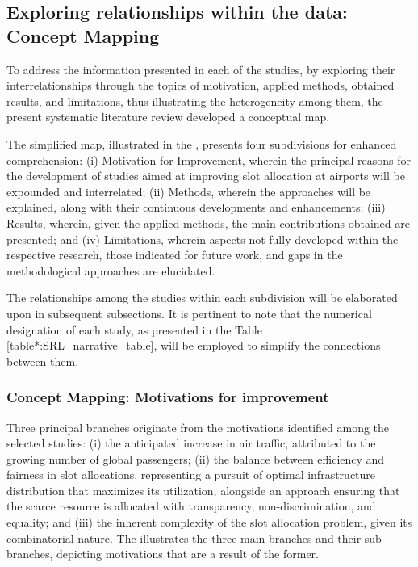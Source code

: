 
\clearpage

\subsection{Exploring relationships within the data: Concept Mapping}

To address the information presented in each of the studies, by exploring their interrelationships through the topics of motivation, applied methods, obtained results, and limitations, thus illustrating the heterogeneity among them, the present systematic literature review developed a conceptual map.

The simplified map, illustrated in the , presents four subdivisions for enhanced comprehension: (i) Motivation for Improvement, wherein the principal reasons for the development of studies aimed at improving slot allocation at airports will be expounded and interrelated; (ii) Methods, wherein the approaches will be explained, along with their continuous developments and enhancements; (iii) Results, wherein, given the applied methods, the main contributions obtained are presented; and (iv) Limitations, wherein aspects not fully developed within the respective research, those indicated for future work, and gaps in the methodological approaches are elucidated.

The relationships among the studies within each subdivision will be elaborated upon in subsequent subsections. It is pertinent to note that the numerical designation of each study, as presented in the Table \ref{table*:SRL_narrative_table}, will be employed to simplify the connections between them.

%

\subsubsection{Concept Mapping: Motivations for improvement}

Three principal branches originate from the motivations identified among the selected studies: (i) the anticipated increase in air traffic, attributed to the growing number of global passengers; (ii) the balance between efficiency and fairness in slot allocations, representing a pursuit of optimal infrastructure distribution that maximizes its utilization, alongside an approach ensuring that the scarce resource is allocated with transparency, non-discrimination, and equality; and (iii) the inherent complexity of the slot allocation problem, given its combinatorial nature. The  illustrates the three main branches and their sub-branches, depicting motivations that are a result of the former.

